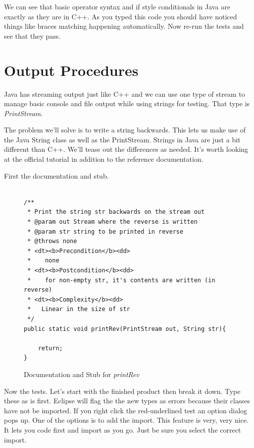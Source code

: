 \documentclass[]{tufte-handout}
\begin{document}
We can see that basic operator syntax and if style conditionals in Java are exactly as they are in C++. As you typed this code you should have noticed things like braces matching happening automatically. Now re-run the tests and see that they pass. 

\section{Output Procedures}

Java has streaming output just like C++ and we can use one type of stream to manage basic console and file output while using strings for testing. That type is \textit{PrintStream}. 

The problem we'll solve is to write a string backwards. This lets us make use of the Java String class as well as the PrintStream. Strings in Java are just a bit different than C++. We'll tease out the differences as needed. It's worth looking at the official tutorial in addition to the reference documentation.

First the documentation and stub.

\begin{figure}
\begin{lstlisting}

/**
 * Print the string str backwards on the stream out
 * @param out Stream where the reverse is written
 * @param str string to be printed in reverse
 * @throws none
 * <dt><b>Precondition</b><dd>
 *    none
 * <dt><b>Postcondition</b><dd>
 *    for non-empty str, it's contents are written (in reverse)
 * <dt><b>Complexity</b><dd> 	 
 *   Linear in the size of str
 */
public static void printRev(PrintStream out, String str){
		
	return;
}

\end{lstlisting}
\label{fig:printrevdox}
\caption{Documentation and Stub for \textit{printRev}}
\end{figure}

Now the tests. Let's start with the finished product then break it down. Type these as is first. Eclipse will flag the the new types as errors because their classes have not be imported. If you right click the red-underlined test an option dialog pops up. One of the options is to add the import. This feature is very, very nice. It lets you code first and import as you go. Just be sure you select the correct import. 
\end{document}

